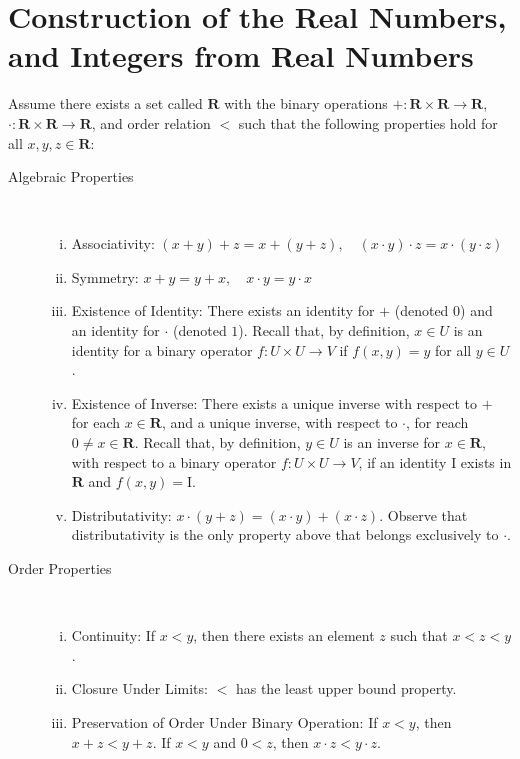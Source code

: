 \section{Construction of the Real Numbers, and Integers from Real Numbers}
\begin{definition}
	Assume there exists a set called $\mathbf{R}$ with the binary operations $+: \mathbf{R} \times
	\mathbf{R} \to \mathbf{R}$, $\cdot: \mathbf{R} \times \mathbf{R} \to \mathbf{R}$, and order relation $<$
	such that the following properties hold for all $x,y,z \in \mathbf{R}$:
	\begin{description}
		\item[Algebraic Properties]\
			\begin{enumerate}[(i)]
				\item{Associativity:} $(x + y) + z = x + (y+z), \quad (x \cdot y) \cdot z = x
					\cdot (y \cdot z)$
				\item{Symmetry:} $x + y = y + x, \quad x \cdot y = y \cdot x$
				\item{Existence of Identity:} There exists an identity for $+$ (denoted $0$) and
					an identity for $\cdot$ (denoted $1$). Recall that, by definition, $x \in U$
					is an identity for a binary operator $f: U\times U \to V$ if $f(x,y) = y$ for
					all $y \in U$.
				\item{Existence of Inverse:} There exists a unique inverse
					with respect to $+$ for each $x \in \mathbf{R}$, and a unique inverse, with respect
					to $\cdot$, for reach $0 \neq x \in \mathbf{R}$. Recall that, by definition,
					$y \in U$ is an inverse for $x \in \mathbf{R}$, with respect to a binary operator $f:
					U \times U \to V$, if an identity I exists in $\mathbf{R}$ and $f(x,y) = \mathrm{I}$.
				\item{Distributativity:} $x \cdot (y+z) = (x \cdot y) + (x \cdot z)$.
					Observe that distributativity is the only property above that belongs
					exclusively to $\cdot$.
			\end{enumerate}
		\item[Order Properties]\
			\begin{enumerate}[(vi)]
				\item{Continuity:}
					If $x<y$, then there exists an element $z$ such that $x <z < y$.
				\item{Closure Under Limits:} $<$ has the least upper bound property.
				\item{Preservation of Order Under Binary Operation:} If $x < y$, then $x + z < y
					+ z$. If $x < y$ and $0 < z$, then $x \cdot z < y \cdot z$.
			\end{enumerate}
	\end{description}
\end{definition}
